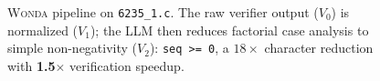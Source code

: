 \documentclass[10pt]{article}
\begin{document}
\begin{figure}[ht!]
\caption{\textsc{Wonda} pipeline on \texttt{6235\_1.c}. The raw verifier output ($V_0$) is normalized ($V_1$); the LLM then reduces factorial case analysis to simple non-negativity ($V_2$): \texttt{seq >= 0}, a $18\times$ character reduction with \textbf{1.5$\times$} verification speedup.}
\label{fig:pipeline_showcase_6235_1_c}
\end{figure}
\end{document}
